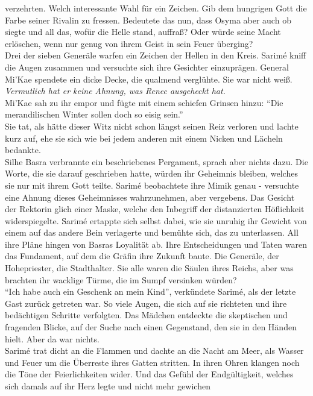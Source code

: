 verzehrten. Welch interessante Wahl für ein Zeichen. Gib dem hungrigen Gott die Farbe seiner Rivalin 
zu fressen. Bedeutete das nun, dass Osyma aber auch ob siegte und all das, wofür die Helle stand, 
auffraß? Oder würde seine Macht erlöschen, wenn nur genug von ihrem Geist in sein Feuer überging?\\
Drei der sieben Generäle warfen ein Zeichen der Hellen in den Kreis. Sarimé kniff die Augen 
zusammen und versuchte sich ihre Gesichter einzuprägen. General Mi'Kae spendete ein dicke Decke, 
die qualmend verglühte. Sie war nicht weiß. \textit{Vermutlich hat er keine Ahnung, was Renec 
ausgeheckt hat.}\\
Mi'Kae sah zu ihr empor und fügte mit einem schiefen Grinsen hinzu: ``Die merandilischen Winter 
sollen doch so eisig sein.''\\
Sie tat, als hätte dieser Witz nicht schon längst seinen Reiz verloren und lachte kurz auf, ehe sie 
sich wie bei jedem anderen mit einem Nicken und Lächeln bedankte.\\
Silhe Basra verbrannte ein beschriebenes Pergament, sprach aber nichts dazu. Die Worte, die sie 
darauf geschrieben hatte, würden ihr Geheimnis bleiben, welches sie nur mit ihrem Gott teilte. 
Sarimé beobachtete ihre Mimik genau - versuchte eine Ahnung dieses Geheimnisses wahrzunehmen, aber 
vergebens. Das Gesicht der Rektorin glich einer Maske, welche den Inbegriff der distanzierten 
Höflichkeit widerspiegelte. Sarimé ertappte sich selbst dabei, wie sie unruhig ihr Gewicht von 
einem auf das andere Bein verlagerte und bemühte sich, das zu unterlassen. All ihre Pläne hingen 
von Basras Loyalität ab. Ihre Entscheidungen und Taten waren das Fundament, auf dem die Gräfin ihre 
Zukunft baute. Die Generäle, der Hohepriester, die Stadthalter. Sie alle waren die Säulen ihres 
Reichs, aber was brachten ihr wacklige Türme, die im Sumpf versinken würden?\\
``Ich habe auch ein Geschenk an mein Kind'', verkündete Sarimé, als der letzte Gast zurück getreten 
war. So viele Augen, die sich auf sie richteten und ihre bedächtigen Schritte verfolgten. Das 
Mädchen entdeckte die skeptischen und fragenden Blicke, auf der Suche nach einen Gegenstand, den 
sie in den Händen hielt. Aber da war nichts.\\
Sarimé trat dicht an die Flammen und dachte an die Nacht am Meer, als Wasser und Feuer um die 
Überreste ihres Gatten stritten. In ihren Ohren klangen noch die Töne der Feierlichkeiten wider. 
Und das Gefühl der Endgültigkeit, welches sich damals auf ihr Herz legte und nicht mehr gewichen 
